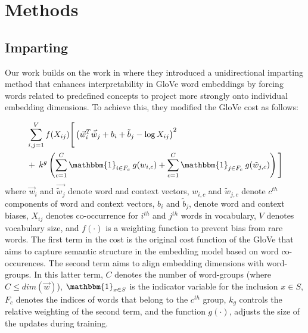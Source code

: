 \documentclass[11pt,a4paper]{article}
\newcommand{\indicator}{\ensuremath{\mathbbm{1}}}
\begin{document}
\section{Methods} \label{sec:methods}

\subsection{Imparting}

Our work builds on the work in \citet{senel20impart} where they introduced a
unidirectional imparting method that
enhances interpretability in GloVe word
embeddings by forcing words related to predefined concepts
to project more strongly onto individual embedding
dimensions.
To achieve this, they modified the GloVe cost as follows:

\begin{align}
\begin{split}
	 &\sum_{i,j=1}^{V} f(X_{ij}) \Bigg[ \left(\vec{w}_i^T\vec{\tilde{w}}_j + b_i + \tilde{b}_j -\log{}X_{ij}\right)^2 \\
	      & +\: k^g\left(\sum_{c=1}^{C} \indicator_{i\in{}F_c} \: g(w_{i,c}) + \sum_{c=1}^{C} \indicator_{j \in F_c} \: g(\tilde{w}_{j,c})  \right) \Bigg] 
\end{split}
\label{eq:glove_uni}
\end{align}
where $\vec{w}_i$ and $\vec{\tilde{w}_j}$ denote word and context vectors, $w_{i,c}$ and $\tilde{w}_{j,c}$ denote $c^{th}$ components of word and context vectors, $b_i$ and $\tilde{b}_j$, denote word and context biases, $X_{ij}$ denotes co-occurrence for $i^{th}$ and $j^{th}$ words in vocabulary, $V$ denotes vocabulary size, and $f(\cdot)$ is a weighting function to prevent bias from rare words. The first term in the cost is the original cost function of the GloVe that aims to capture semantic structure in the embedding model based on word co-occurences. The second term aims to align embedding dimensions with word-groups. In this latter term, $C$ denotes the number of word-groups (where $C\leq dim(\vec{w})$), $\indicator_{x \in S}$ is the indicator variable for the inclusion ${x \in S}$, $F_c$ denotes the indices of words that belong to the $c^{th}$ group, $k_g$ controls the relative weighting of the second term, and the function $g(\cdot)$, adjusts the size of the updates during training. 
\end{document}
